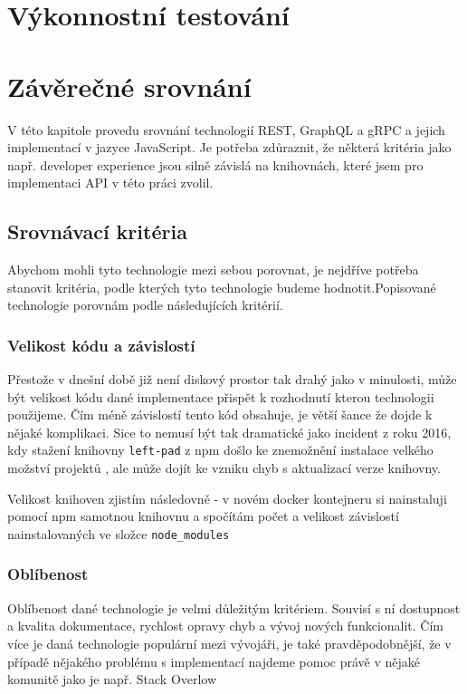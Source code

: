 \documentclass[thesis=M,czech]{FITthesis}[2019/12/23]
\begin{document}
\chapter{Výkonnostní testování}


\chapter{Závěrečné srovnání}
V této kapitole provedu srovnání technologií REST, GraphQL a gRPC a jejich implementací v jazyce JavaScript. Je potřeba zdůraznit, že některá kritéria jako např. developer experience jsou silně závislá na knihovnách, které jsem pro implementaci API v této práci zvolil.


\section{Srovnávací kritéria}
Abychom mohli tyto technologie mezi sebou porovnat, je nejdříve potřeba stanovit kritéria, podle kterých tyto technologie budeme hodnotit.Popisované technologie porovnám podle následujících kritérií.

\subsection{Velikost kódu a závislostí}
Přestože v dnešní době již není diskový prostor tak drahý jako v minulosti, může být velikost kódu dané implementace přispět k rozhodnutí kterou technologii použijeme. Čím méně závislostí tento kód obsahuje, je větší šance že dojde k nějaké komplikaci. Sice to nemusí být tak dramatické jako incident z roku 2016, kdy stažení knihovny \texttt{left-pad} z npm došlo ke znemožnění instalace velkého možství projektů \cite{left_pad},  ale může dojít ke vzniku chyb s aktualizací verze knihovny.

Velikost knihoven zjistím následovně - v novém docker kontejneru si nainstaluji pomocí npm samotnou knihovnu a spočítám počet a velikost závislostí nainstalovaných ve složce \texttt{node_modules}


\subsection{Oblíbenost}
Oblíbenost dané technologie je velmi důležitým kritériem. Souvisí s ní dostupnost a kvalita dokumentace, rychlost opravy chyb a vývoj nových funkcionalit. Čím více je daná technologie populární mezi vývojáři, je také pravděpodobnější, že v případě nějakého problému s implementací najdeme pomoc právě v nějaké komunitě jako je např. Stack Overlow%
\end{document}
